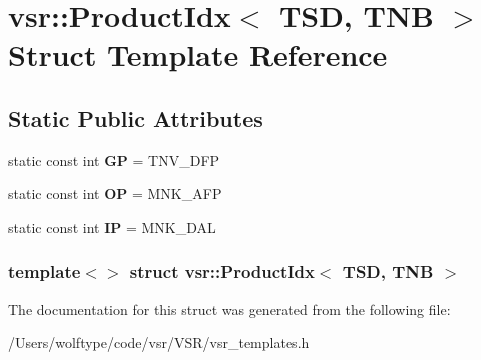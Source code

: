 \hypertarget{structvsr_1_1_product_idx_3_01_t_s_d_00_01_t_n_b_01_4}{\section{vsr\-:\-:Product\-Idx$<$ T\-S\-D, T\-N\-B $>$ Struct Template Reference}
\label{structvsr_1_1_product_idx_3_01_t_s_d_00_01_t_n_b_01_4}
}
\subsection*{Static Public Attributes}
\begin{DoxyCompactItemize}
\item 
\hypertarget{structvsr_1_1_product_idx_3_01_t_s_d_00_01_t_n_b_01_4_ab8ee0c5cb8686541fec59ceab55bca77}{static const int {\bfseries G\-P} = T\-N\-V\-\_\-\-D\-F\-P}\label{structvsr_1_1_product_idx_3_01_t_s_d_00_01_t_n_b_01_4_ab8ee0c5cb8686541fec59ceab55bca77}

\item 
\hypertarget{structvsr_1_1_product_idx_3_01_t_s_d_00_01_t_n_b_01_4_a42c7e7349b93943107dd71c34010c23a}{static const int {\bfseries O\-P} = M\-N\-K\-\_\-\-A\-F\-P}\label{structvsr_1_1_product_idx_3_01_t_s_d_00_01_t_n_b_01_4_a42c7e7349b93943107dd71c34010c23a}

\item 
\hypertarget{structvsr_1_1_product_idx_3_01_t_s_d_00_01_t_n_b_01_4_a3a438135d8ad8757989a5b00081556e6}{static const int {\bfseries I\-P} = M\-N\-K\-\_\-\-D\-A\-L}\label{structvsr_1_1_product_idx_3_01_t_s_d_00_01_t_n_b_01_4_a3a438135d8ad8757989a5b00081556e6}

\end{DoxyCompactItemize}
\subsubsection*{template$<$$>$ struct vsr\-::\-Product\-Idx$<$ T\-S\-D, T\-N\-B $>$}



The documentation for this struct was generated from the following file\-:\begin{DoxyCompactItemize}
\item 
/\-Users/wolftype/code/vsr/\-V\-S\-R/vsr\-\_\-templates.\-h\end{DoxyCompactItemize}

